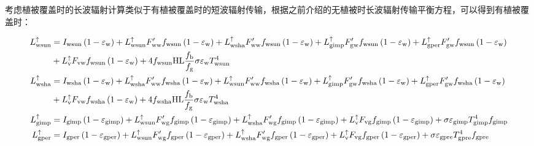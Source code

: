 考虑植被覆盖时的长波辐射计算类似于有植被覆盖时的短波辐射传输，根据之前介绍的无植被时长波辐射传输平衡方程，可以得到有植被覆盖时：
\begin{landscape}
  \begin{equation}
    \begin{aligned}
      L_{\mathrm{{wsun }}}^{\uparrow} &=I_{\mathrm{{wsun }}}\left(1-\varepsilon_{\mathrm{w}}\right)+L_{\mathrm{wsun}}^{\uparrow} F_{\mathrm{ww}}^{\prime} f_{\mathrm{wsun}}\left(1-\varepsilon_{\mathrm{w}}\right)+L_{\mathrm{wsha}}^{\uparrow} F_{\mathrm{ww}}^{\prime} f_{\mathrm{wsun}}\left(1-\varepsilon_{\mathrm{w}}\right)+L_{\mathrm{gimp}}^{\uparrow} F_{\mathrm{g w}}^{\prime} f_{\mathrm{wsun}}\left(1-\varepsilon_{\mathrm{w}}\right)+L_{\mathrm{gper}}^{\uparrow} F_{\mathrm{g w}}^{\prime} f_{\mathrm{wsun}}\left(1-\varepsilon_{\mathrm{w}}\right)\\ &+L_{\mathrm{v}}^{\uparrow} F_{\mathrm{vw}} f_{\mathrm{wsun}}\left(1-\varepsilon_{\mathrm{w}}\right)+4 f_{\mathrm{wsun}} {\rm HL} \frac{f_{\mathrm{b}}}{f_{\mathrm{g}}} \sigma \varepsilon_{\mathrm{w}} T_{\mathrm{wsun}}^{4} \\
      L_{\mathrm{wsha}}^{\uparrow} &=I_{\mathrm{wsha}}\left(1-\varepsilon_{\mathrm{w}}\right)+L_{\mathrm{wsha}}^{\uparrow} F_{\mathrm{ww}}^{\prime} f_{\mathrm{wsha}}\left(1-\varepsilon_{\mathrm{w}}\right)+L_{\mathrm{wsun}}^{\uparrow} F_{\mathrm{ww}}^{\prime} f_{\mathrm{wsha}}\left(1-\varepsilon_{\mathrm{w}}\right)+L_{\mathrm{gimp}}^{\uparrow} F_{\mathrm{g w}}^{\prime} f_{\mathrm{wsha}}\left(1-\varepsilon_{\mathrm{w}}\right)+L_{\mathrm{gper}}^{\uparrow} F_{\mathrm{g w}}^{\prime} f_{\mathrm{wsha}}\left(1-\varepsilon_{\mathrm{w}}\right)\\ &+L_{\mathrm{v}}^{\uparrow} F_{\mathrm{v w}} f_{\mathrm{wsha}}\left(1-\varepsilon_{\mathrm{w}}\right)+4 f_{\mathrm{wsha}} { \rm HL} \frac{f_{\mathrm{b}}}{f_{\mathrm{g}}} \sigma \varepsilon_{\mathrm{w}} T_{\mathrm{wsha}}^{4}\\
      L_{\mathrm{gimp}}^{\uparrow} &=I_{\mathrm{gimp}}\left(1-\varepsilon_{\mathrm{gimp}}\right)+L_{\mathrm{wsun}}^{\uparrow} F_{\mathrm{w g}}^{\prime} f_{\mathrm{gimp}}\left(1-\varepsilon_{\mathrm{gimp}}\right)+L_{\mathrm{wsha}}^{\uparrow} F_{\mathrm{w g}}^{\prime} f_{\mathrm{gimp}}\left(1-\varepsilon_{\mathrm{gimp}}\right)+L_{\mathrm{v}}^{\uparrow} F_{\mathrm{v g}} f_{\mathrm{gimp}}\left(1-\varepsilon_{\mathrm{gimp}}\right)+\sigma \varepsilon_{\mathrm{gimp}} T_{\mathrm{gimp}}^{4} f_{\mathrm{gimp}} \\
      L_{\mathrm{gper}}^{\uparrow} &=I_{\mathrm{gper}}\left(1-\varepsilon_{\mathrm{gper}}\right)+L_{\mathrm{wsun}}^{\uparrow} F_{\mathrm{w g}}^{\prime} f_{\mathrm{gper}}\left(1-\varepsilon_{\mathrm{gper}}\right)+L_{\mathrm{wsha}}^{\uparrow} F_{\mathrm{w g}}^{\prime} f_{\mathrm{gper}}\left(1-\varepsilon_{\mathrm{gper}}\right)+L_{\mathrm{v}}^{\uparrow} F_{\mathrm{v g}} f_{\mathrm{gper}}\left(1-\varepsilon_{\mathrm{gper}}\right)+\sigma \varepsilon_{\mathrm{{gpre }}} T_{\mathrm{{gpre }}}^{4} f_{\mathrm{{gpre }}} \\

\end{aligned}
\end{equation}
\end{landscape}
